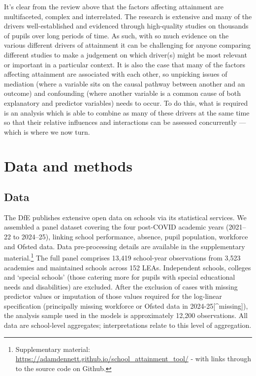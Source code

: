 \documentclass[
  12pt,
  titlepage]{article}
\begin{document}
It's clear from the review above that the factors affecting attainment
are multifaceted, complex and interrelated. The research is extensive
and many of the drivers well-established and evidenced through
high-quality studies on thousands of pupils over long periods of time.
As such, with so much evidence on the various different drivers of
attainment it can be challenging for anyone comparing different studies
to make a judgement on which driver(s) might be most relevant or
important in a particular context. It is also the case that many of the
factors affecting attainment are associated with each other, so
unpicking issues of mediation (where a variable sits on the causal
pathway between another and an outcome) and confounding (where another
variable is a common cause of both explanatory and predictor variables)
needs to occur. To do this, what is required is an analysis which is
able to combine as many of these drivers at the same time so that their
relative influences and interactions can be assessed concurrently ---
which is where we now turn.

\section{Data and methods}\label{data-and-methods}

\subsection{Data}\label{data}

The DfE publishes extensive open data on schools via its statistical
services. We assembled a panel dataset covering the four post-COVID
academic years (2021--22 to 2024--25), linking school performance,
absence, pupil population, workforce and Ofsted data. Data
pre-processing details are available in the supplementary
material.\footnote{Supplementary material:
  \url{https://adamdennett.github.io/school_attainment_tool/} - with
  links through to the source code on Github.} The full panel comprises
13,419 school-year observations from 3,523 academies and maintained
schools across 152 LEAs. Independent schools, colleges and `special
schools' (those catering more for pupils with special educational needs
and disabilities) are excluded. After the exclusion of cases with
missing predictor values or imputation of those values required for the
log-linear specification (principally missing workforce or Ofsted data
in 2024-25{[}\^{}missing{]}), the analysis sample used in the models is
approximately 12,200 observations. All data are school-level aggregates;
interpretations relate to this level of aggregation.
\end{document}
